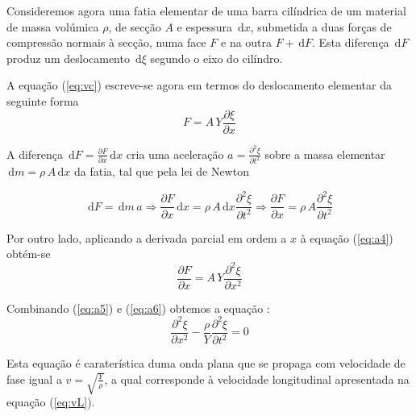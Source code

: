 \documentclass[a4paper,12pt]{article}
\newcommand{\ud}{\,\mathrm{d}}
\begin{document}

Consideremos agora uma fatia elementar de uma barra cilíndrica de um material de massa volúmica $\rho$, de secção $A$ e espessura $\ud x$, submetida a duas forças de compressão normais à secção, numa face $F$ e na outra $F+\ud F$. Esta diferença $\ud F$ produz um deslocamento  $\ud \xi$  segundo o eixo do cilíndro.

A equação (\ref{eq:vc}) escreve-se agora em termos do deslocamento elementar da seguinte forma
\begin{equation}
	\label{eq:a4}
	 F = A \, Y \frac{\partial \xi }{\partial x} 
\end{equation}

A diferença $\ud F = \frac{\partial F }{\partial x} \ud x $ cria uma aceleração $a=\frac{\partial^2 \xi }{\partial t^2} $  sobre a massa elementar $\ud m= \rho\,A \ud x $ da fatia, tal que pela lei de Newton

\begin{equation}
	\label{eq:a5}
	 \ud F=\ud m\,a\Rightarrow \frac{\partial F }{\partial x} \ud x  =  \rho\,A \ud x \frac{\partial^2 \xi }{\partial t^2} \Rightarrow \frac{\partial F }{\partial x} = \rho\,A  \frac{\partial^2 \xi }{\partial t^2}
\end{equation}

Por outro lado, aplicando a derivada parcial em ordem a $x$ à equação (\ref{eq:a4}) obtém-se
\begin{equation}
	\label{eq:a6}
	\frac{\partial F }{\partial x} = A \, Y \frac{\partial^2 \xi }{\partial x^2}
\end{equation}	

Combinando (\ref{eq:a5}) e (\ref{eq:a6}) obtemos a equação :
\begin{equation}
	\label{eq:a7}
	\frac{\partial^2 \xi }{\partial x^2} - \frac{\rho}{Y} \frac{\partial^2 \xi }{\partial t^2} =0
\end{equation}	

Esta equação é caraterística duma onda plana que se propaga com velocidade de fase igual a $v=\sqrt{\frac{Y}{\rho}}$, a qual corresponde à velocidade longitudinal apresentada na equação (\ref{eq:vL}). 
\end{document}
